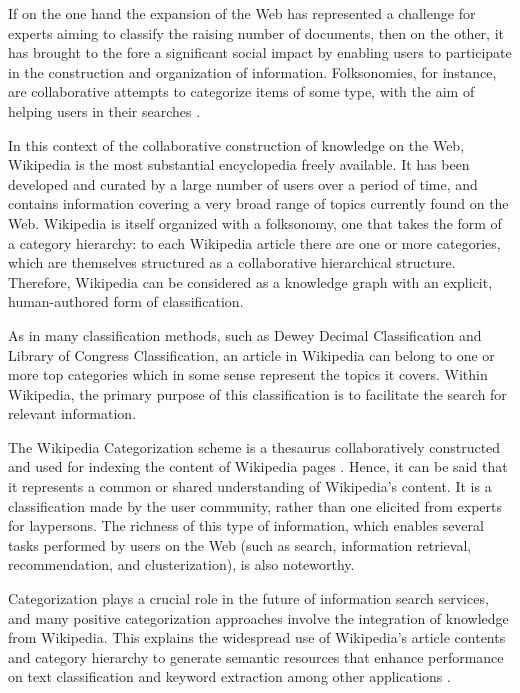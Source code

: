 If on the one hand the expansion of the Web has represented a challenge for experts aiming to classify the raising number of documents, then on the other, it has brought to the fore a significant social impact by enabling users to participate in the construction and organization of information. Folksonomies, for instance, are collaborative attempts to categorize items of some type, with the aim of helping users in their searches \cite{peters2009folksonomies}.

In this context of the collaborative construction of knowledge on the Web, Wikipedia is the most substantial encyclopedia freely available. It has been developed and curated by a large number of users over a period of time, and contains information covering a very broad range of topics currently found on the Web. Wikipedia is itself organized with a folksonomy, one that takes the form of a category hierarchy: to each Wikipedia article there are one or more categories, which are themselves structured as a collaborative hierarchical structure. Therefore, Wikipedia can be considered as a knowledge graph with an explicit, human-authored form of classification.

As in many classification methods, such as Dewey Decimal Classification\cite{mitchell1996dewey} and Library of Congress Classification\cite{chan2016guide}, an article in Wikipedia can belong to one or more top categories which in some sense represent the topics it covers. Within Wikipedia, the primary purpose of this classification is to facilitate the search for relevant information.


The Wikipedia Categorization scheme is a thesaurus collaboratively constructed and used for indexing the content of Wikipedia pages \cite{voss2006collaborative}. Hence, it can be said that it represents a common or shared understanding of Wikipedia's content. It is a classification made by the user community, rather than one elicited from experts for laypersons. The richness of this type of information, which enables several tasks performed by users on the Web (such as search, information retrieval, recommendation, and clusterization), is also noteworthy.


Categorization plays a crucial role in the future of information search services, and many positive categorization approaches involve the integration of knowledge from Wikipedia. This explains the widespread use of Wikipedia’s article contents and category hierarchy to generate semantic resources that enhance performance on text classification and keyword extraction among other applications \cite{gantner2009automatic}. 


